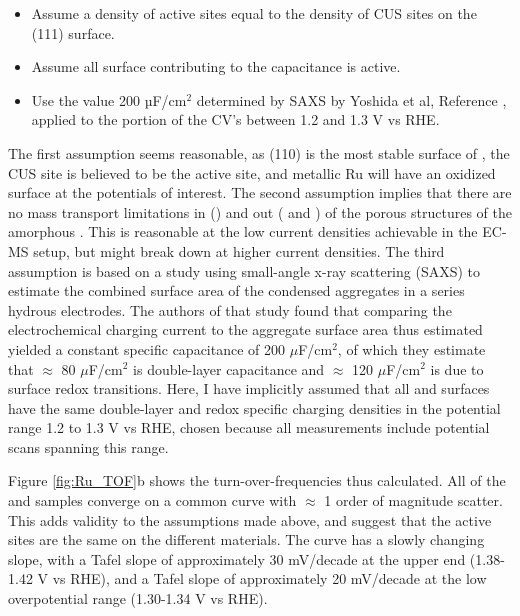 \begin{itemize}
	
	\item Assume a density of active sites equal to the density of CUS sites on the (111) surface.
	
	\item Assume all surface contributing to the capacitance is active.
		
	\item Use the value 200 $µ$F/cm$^2$ determined by SAXS by Yoshida et al, Reference , applied to the portion of the CV's between 1.2 and 1.3 V vs RHE.
\end{itemize}

The first assumption seems reasonable, as (110) is the most stable surface of , the CUS site is believed to be the active site\cite{Reier2017, Rao2017}, and metallic Ru will have an oxidized surface at the potentials of interest. The second assumption implies that there are no mass transport limitations in () and out ( and ) of the porous structures of the amorphous . This is reasonable at the low current densities achievable in the EC-MS setup, but might break down at higher current densities. The third assumption is based on a study using small-angle x-ray scattering (SAXS) to estimate the combined surface area of the condensed  aggregates in a series hydrous  electrodes\cite{Yoshida2013}. The authors of that study found that comparing the electrochemical charging current to the aggregate surface area thus estimated yielded a constant specific capacitance of 200 $\mu$F/cm$^2$, of which they estimate that $\approx$ 80 $\mu$F/cm$^2$ is double-layer capacitance and $\approx$ 120 $\mu$F/cm$^2$ is due to surface redox transitions. Here, I have implicitly assumed that all  and  surfaces have the same double-layer and redox specific charging densities in the potential range 1.2 to 1.3 V vs RHE, chosen because all measurements include potential scans spanning this range.

Figure \ref{fig:Ru_TOF}b shows the turn-over-frequencies thus calculated. All of the  and  samples converge on a common curve with $\approx$ 1 order of magnitude scatter. This adds validity to the assumptions made above, and suggest that the active sites are the same on the different materials. The curve has a slowly changing slope, with a Tafel slope of approximately 30 mV/decade at the upper end (1.38-1.42 V vs RHE), and a Tafel slope of approximately 20 mV/decade at the low overpotential range (1.30-1.34 V vs RHE). 

